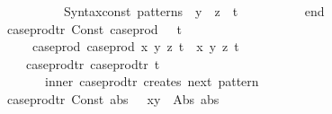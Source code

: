 \begin{isabellebody}
\ \ \ \ \ \ \ \ \ \ \ \ \ \ \ \ {\isacharparenleft}{\kern0pt}Syntax{\isachardot}{\kern0pt}const\ \isactrlsyntaxUNDERSCOREconst {\isasymopen}{\isacharunderscore}{\kern0pt}patterns{\isasymclose}\ {\isachardollar}{\kern0pt}\ y\ {\isachardollar}{\kern0pt}\ z{\isacharparenright}{\kern0pt}{\isacharparenright}{\kern0pt}\ {\isachardollar}{\kern0pt}\ t{\isacharprime}{\kern0pt}{\isacharprime}{\kern0pt}\isanewline
\ \ \ \ \ \ \ \ \ \ end\isanewline
\ \ \ \ \ \ {\isacharbar}{\kern0pt}\ case{\isacharunderscore}{\kern0pt}prod{\isacharunderscore}{\kern0pt}tr{\isacharprime}{\kern0pt}\ {\isacharbrackleft}{\kern0pt}Const\ {\isacharparenleft}{\kern0pt}\isactrlconstUNDERSCOREsyntax {\isasymopen}case{\isacharunderscore}{\kern0pt}prod{\isasymclose}{\isacharcomma}{\kern0pt}\ {\isacharunderscore}{\kern0pt}{\isacharparenright}{\kern0pt}\ {\isachardollar}{\kern0pt}\ t{\isacharbrackright}{\kern0pt}\ {\isacharequal}{\kern0pt}\isanewline
\ \ \ \ \ \ \ \ \ \ {\isacharparenleft}{\kern0pt}{\isacharasterisk}{\kern0pt}\ case{\isacharunderscore}{\kern0pt}prod\ {\isacharparenleft}{\kern0pt}case{\isacharunderscore}{\kern0pt}prod\ {\isacharparenleft}{\kern0pt}{\isasymlambda}x\ y\ z{\isachardot}{\kern0pt}\ t{\isacharparenright}{\kern0pt}{\isacharparenright}{\kern0pt}\ {\isasymRightarrow}\ {\isasymlambda}{\isacharparenleft}{\kern0pt}{\isacharparenleft}{\kern0pt}x{\isacharcomma}{\kern0pt}\ y{\isacharparenright}{\kern0pt}{\isacharcomma}{\kern0pt}\ z{\isacharparenright}{\kern0pt}{\isachardot}{\kern0pt}\ t\ {\isacharasterisk}{\kern0pt}{\isacharparenright}{\kern0pt}\isanewline
\ \ \ \ \ \ \ \ \ \ case{\isacharunderscore}{\kern0pt}prod{\isacharunderscore}{\kern0pt}tr{\isacharprime}{\kern0pt}\ {\isacharbrackleft}{\kern0pt}{\isacharparenleft}{\kern0pt}case{\isacharunderscore}{\kern0pt}prod{\isacharunderscore}{\kern0pt}tr{\isacharprime}{\kern0pt}\ {\isacharbrackleft}{\kern0pt}t{\isacharbrackright}{\kern0pt}{\isacharparenright}{\kern0pt}{\isacharbrackright}{\kern0pt}\isanewline
\ \ \ \ \ \ \ \ \ \ \ \ {\isacharparenleft}{\kern0pt}{\isacharasterisk}{\kern0pt}\ inner\ case{\isacharunderscore}{\kern0pt}prod{\isacharunderscore}{\kern0pt}tr{\isacharprime}{\kern0pt}\ creates\ next\ pattern\ {\isacharasterisk}{\kern0pt}{\isacharparenright}{\kern0pt}\isanewline
\ \ \ \ \ \ {\isacharbar}{\kern0pt}\ case{\isacharunderscore}{\kern0pt}prod{\isacharunderscore}{\kern0pt}tr{\isacharprime}{\kern0pt}\ {\isacharbrackleft}{\kern0pt}Const\ {\isacharparenleft}{\kern0pt}\isactrlsyntaxUNDERSCOREconst {\isasymopen}{\isacharunderscore}{\kern0pt}abs{\isasymclose}{\isacharcomma}{\kern0pt}\ {\isacharunderscore}{\kern0pt}{\isacharparenright}{\kern0pt}\ {\isachardollar}{\kern0pt}\ x{\isacharunderscore}{\kern0pt}y\ {\isachardollar}{\kern0pt}\ Abs\ abs{\isacharbrackright}{\kern0pt}\ {\isacharequal}{\kern0pt}\isanewline

\end{isabellebody}
